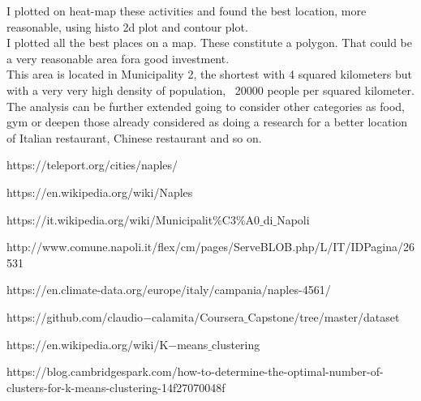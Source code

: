 \documentclass[a4paper, 12pt, oneside]{book}
\begin{document}
I plotted on heat-map these activities and found the best location, more reasonable, using histo 2d plot and contour plot. \\

I plotted all the best places on a map. These constitute a polygon. That could be a very reasonable area fora good investment. \\

This area is located in Municipality 2, the shortest with 4 squared kilometers but with a very very high density of population, ~20000 people per squared kilometer. \\

The analysis can be further extended going to consider other categories as food, gym or deepen those already considered as doing a research for a better location of Italian restaurant, Chinese restaurant and so on.

\begin{thebibliography}{9}
https://teleport.org/cities/naples/
 
https://en.wikipedia.org/wiki/Naples

https://it.wikipedia.org/wiki/Municipalit$\%$C3$\%$A0$\_$di$\_$Napoli

http://www.comune.napoli.it/flex/cm/pages/ServeBLOB.php/L/IT/IDPagina/26531 

https://en.climate-data.org/europe/italy/campania/naples-4561/

https://github.com/claudio$-$calamita/Coursera$\_$Capstone/tree/master/dataset

https://en.wikipedia.org/wiki/K$-$means$\_$clustering

https://blog.cambridgespark.com/how-to-determine-the-optimal-number-of-clusters-for-k-means-clustering-14f27070048f
\end{thebibliography}
\end{document}
